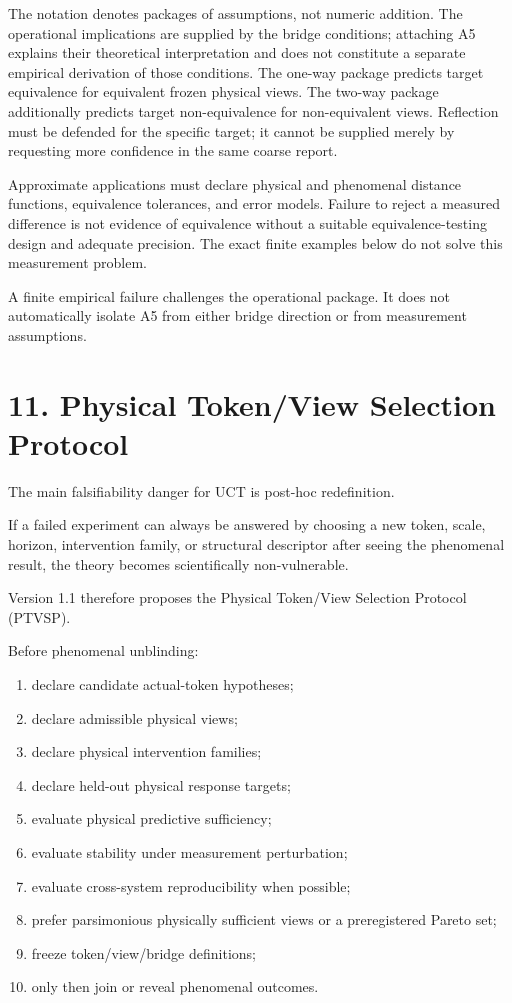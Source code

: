 \documentclass[
  11pt,
  a4paper,
]{article}
\providecommand{\tightlist}{%
  \setlength{\itemsep}{0pt}\setlength{\parskip}{0pt}}
\begin{document}
The notation denotes packages of assumptions, not numeric addition. The
operational implications are supplied by the bridge conditions;
attaching A5 explains their theoretical interpretation and does not
constitute a separate empirical derivation of those conditions. The
one-way package predicts target equivalence for equivalent frozen
physical views. The two-way package additionally predicts target
non-equivalence for non-equivalent views. Reflection must be defended
for the specific target; it cannot be supplied merely by requesting more
confidence in the same coarse report.

Approximate applications must declare physical and phenomenal distance
functions, equivalence tolerances, and error models. Failure to reject a
measured difference is not evidence of equivalence without a suitable
equivalence-testing design and adequate precision. The exact finite
examples below do not solve this measurement problem.

A finite empirical failure challenges the operational package. It does
not automatically isolate A5 from either bridge direction or from
measurement assumptions.

\hypertarget{physical-tokenview-selection-protocol}{%
\section{11. Physical Token/View Selection
Protocol}\label{physical-tokenview-selection-protocol}}

The main falsifiability danger for UCT is post-hoc redefinition.

If a failed experiment can always be answered by choosing a new token,
scale, horizon, intervention family, or structural descriptor after
seeing the phenomenal result, the theory becomes scientifically
non-vulnerable.

Version 1.1 therefore proposes the Physical Token/View Selection
Protocol (PTVSP).

Before phenomenal unblinding:

\begin{enumerate}
\def\labelenumi{\arabic{enumi}.}
\tightlist
\item
  declare candidate actual-token hypotheses;
\item
  declare admissible physical views;
\item
  declare physical intervention families;
\item
  declare held-out physical response targets;
\item
  evaluate physical predictive sufficiency;
\item
  evaluate stability under measurement perturbation;
\item
  evaluate cross-system reproducibility when possible;
\item
  prefer parsimonious physically sufficient views or a preregistered
  Pareto set;
\item
  freeze token/view/bridge definitions;
\item
  only then join or reveal phenomenal outcomes.
\end{enumerate}
\end{document}
